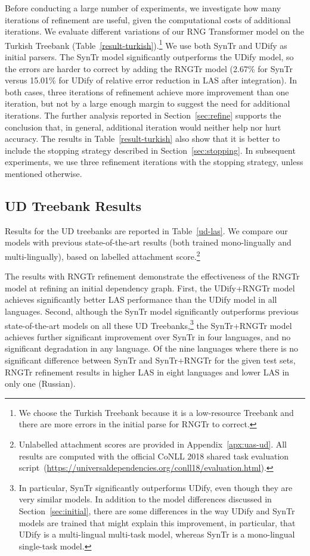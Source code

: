 Before conducting a large number of experiments, we investigate how many iterations of refinement are useful, given the computational costs of additional iterations.  
We evaluate different variations of our RNG Transformer model on the Turkish Treebank (Table~\ref{result-turkish}).\footnote{We choose the Turkish Treebank because it is a low-resource Treebank and there are more errors in the initial parse for RNGTr to correct.} We use both SynTr and UDify as initial parsers. The SynTr model significantly outperforms the UDify model, so the errors are harder to correct by adding the RNGTr model (2.67\% for SynTr versus 15.01\% for UDify of relative error reduction in LAS after integration).  In both cases, three iterations of refinement achieve more improvement than one iteration, but not by a large enough margin to suggest the need for additional iterations.  The further analysis reported in Section~\ref{sec:refine} supports the conclusion that, in general, additional iteration would neither help nor hurt accuracy.  The results in Table~\ref{result-turkish} also show that it is better to include the stopping strategy described in Section~\ref{sec:stopping}.
In subsequent experiments, we use three refinement iterations with the stopping strategy, unless mentioned otherwise.


\subsection{UD Treebank Results}
\label{sec:ud-results}

Results for the UD treebanks are reported in Table~\ref{ud-las}.
We compare our models with previous state-of-the-art results (both trained mono-lingually and multi-lingually), based on labelled attachment score.\footnote{Unlabelled attachment scores are provided in Appendix~\ref{apx:uas-ud}.  All results are computed with the official CoNLL 2018 shared task evaluation script~(\url{https://universaldependencies.org/conll18/evaluation.html}).}

The results with RNGTr refinement demonstrate the effectiveness of the RNGTr model at refining an initial dependency graph.
First, the UDify+RNGTr model achieves significantly better LAS performance than the UDify model in all languages.
Second, although 
the SynTr model significantly outperforms previous state-of-the-art models on all these UD Treebanks,\footnote{ In particular, SynTr significantly outperforms UDify, even though they are very similar models. In addition to the model differences discussed in Section~\ref{sec:initial},
there are some differences in the way UDify and SynTr models are trained that might explain this improvement, in particular, that UDify is a multi-lingual multi-task model, whereas
SynTr is a mono-lingual single-task model.
}
the SynTr+RNGTr model achieves further significant improvement over SynTr in four languages, and no significant degradation in any language.  Of the nine languages where there is no significant difference between SynTr and SynTr+RNGTr for the given test sets, RNGTr refinement results in higher LAS in eight languages and lower LAS in only one (Russian).

